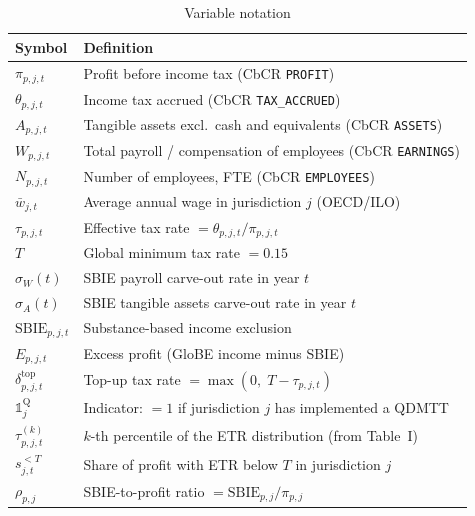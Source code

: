 \documentclass[11pt,a4paper]{article}
\newcommand{\code}[1]{\texttt{#1}}
\begin{document}
\begin{table}[H]
\centering
\caption{Variable notation}
\label{tab:notation}
\small
\begin{tabular}{@{}ll@{}}
\toprule
Symbol & Definition \\
\midrule
$\pi_{p,j,t}$ & Profit before income tax (CbCR \code{PROFIT}) \\
$\theta_{p,j,t}$ & Income tax accrued (CbCR \code{TAX\_ACCRUED}) \\
$A_{p,j,t}$ & Tangible assets excl.\ cash and equivalents (CbCR \code{ASSETS}) \\
$W_{p,j,t}$ & Total payroll / compensation of employees (CbCR \code{EARNINGS}) \\
$N_{p,j,t}$ & Number of employees, FTE (CbCR \code{EMPLOYEES}) \\
$\bar{w}_{j,t}$ & Average annual wage in jurisdiction $j$ (OECD/ILO) \\
$\tau_{p,j,t}$ & Effective tax rate $= \theta_{p,j,t} / \pi_{p,j,t}$ \\
$T$ & Global minimum tax rate $= 0.15$ \\
$\sigma_W(t)$ & SBIE payroll carve-out rate in year $t$ \\
$\sigma_A(t)$ & SBIE tangible assets carve-out rate in year $t$ \\
$\text{SBIE}_{p,j,t}$ & Substance-based income exclusion \\
$E_{p,j,t}$ & Excess profit (GloBE income minus SBIE) \\
$\delta_{p,j,t}^{\text{top}}$ & Top-up tax rate $= \max(0,\; T - \tau_{p,j,t})$ \\
$\mathbb{1}_j^{\text{Q}}$ & Indicator: $=1$ if jurisdiction $j$ has implemented a QDMTT \\
$\tau_{p,j,t}^{(k)}$ & $k$-th percentile of the ETR distribution (from Table~I) \\
$s_{j,t}^{<T}$ & Share of profit with ETR below $T$ in jurisdiction $j$ \\
$\rho_{p,j}$ & SBIE-to-profit ratio $= \text{SBIE}_{p,j} / \pi_{p,j}$ \\
\bottomrule
\end{tabular}
\end{table}
\end{document}
